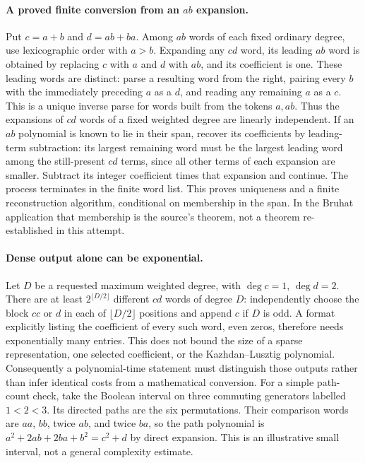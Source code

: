 \documentclass[11pt]{article}
\begin{document}
\paragraph{A proved finite conversion from an $ab$ expansion.}
Put $c=a+b$ and $d=ab+ba$. Among $ab$ words of each fixed ordinary degree,
use lexicographic order with $a>b$. Expanding any $cd$ word, its leading
$ab$ word is obtained by replacing $c$ with $a$ and $d$ with $ab$, and its
coefficient is one. These leading words are distinct: parse a resulting word
from the right, pairing every $b$ with the immediately preceding $a$ as a
$d$, and reading any remaining $a$ as a $c$. This is a unique inverse parse
for words built from the tokens $a,ab$.
Thus the expansions of $cd$ words of a fixed weighted degree are linearly
independent. If an $ab$ polynomial is known to lie in their span, recover its
coefficients by leading-term subtraction: its largest remaining word must be
the largest leading word among the still-present $cd$ terms, since all other
terms of each expansion are smaller. Subtract its integer coefficient times
that expansion and continue. The process terminates in the finite word list.
This proves uniqueness and a finite reconstruction algorithm, conditional on
membership in the span. In the Bruhat application that membership is the
source's theorem, not a theorem re-established in this attempt.

\paragraph{Dense output alone can be exponential.}
Let $D$ be a requested maximum weighted degree, with $\deg c=1$, $\deg d=2$.
There are at least $2^{\lfloor D/2\rfloor}$ different $cd$ words of degree
$D$: independently choose the block $cc$ or $d$ in each of
$\lfloor D/2\rfloor$ positions and append $c$ if $D$ is odd.
A format explicitly listing the coefficient of every such word, even zeros,
therefore needs exponentially many entries. This does not bound the size of a
sparse representation, one selected coefficient, or the Kazhdan--Lusztig
polynomial. Consequently a polynomial-time statement must distinguish those
outputs rather than infer identical costs from a mathematical conversion.
For a simple path-count check, take the Boolean interval on three commuting
generators labelled $1<2<3$. Its directed paths are the six permutations.
Their comparison words are $aa$, $bb$, twice $ab$, and twice $ba$, so the
path polynomial is $a^2+2ab+2ba+b^2=c^2+d$ by direct expansion.
This is an illustrative small interval, not a general complexity estimate.
\end{document}
